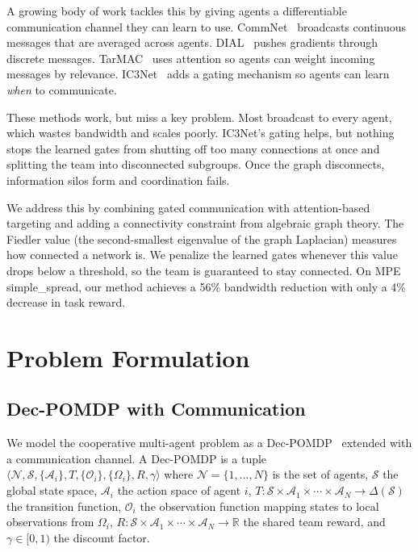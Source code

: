 \documentclass[letterpaper, 10 pt, journal, twoside]{IEEEtran}
\begin{document}
A growing body of work tackles this by giving agents a differentiable communication channel they can learn to use. CommNet~\cite{Sukhbaatar2016} broadcasts continuous messages that are averaged across agents. DIAL~\cite{Foerster2016} pushes gradients through discrete messages. TarMAC~\cite{Das2019} uses attention so agents can weight incoming messages by relevance. IC3Net~\cite{Singh2019} adds a gating mechanism so agents can learn \emph{when} to communicate.

These methods work, but miss a key problem. Most broadcast to every agent, which wastes bandwidth and scales poorly. IC3Net's gating helps, but nothing stops the learned gates from shutting off too many connections at once and splitting the team into disconnected subgroups. Once the graph disconnects, information silos form and coordination fails.

We address this by combining gated communication with attention-based targeting and adding a connectivity constraint from algebraic graph theory. The Fiedler value (the second-smallest eigenvalue of the graph Laplacian) measures how connected a network is. We penalize the learned gates whenever this value drops below a threshold, so the team is guaranteed to stay connected. On MPE simple\_spread, our method achieves a 56\% bandwidth reduction with only a 4\% decrease in task reward.

\section{Problem Formulation}

\subsection{Dec-POMDP with Communication}

We model the cooperative multi-agent problem as a Dec-POMDP~\cite{Oliehoek2016} extended with a communication channel. A Dec-POMDP is a tuple $\langle \mathcal{N}, \mathcal{S}, \{\mathcal{A}_i\}, T, \{\mathcal{O}_i\}, \{\Omega_i\}, R, \gamma \rangle$ where $\mathcal{N} = \{1, \dots, N\}$ is the set of agents, $\mathcal{S}$ the global state space, $\mathcal{A}_i$ the action space of agent $i$, $T: \mathcal{S} \times \mathcal{A}_1 \times \cdots \times \mathcal{A}_N \rightarrow \Delta(\mathcal{S})$ the transition function, $\mathcal{O}_i$ the observation function mapping states to local observations from $\Omega_i$, $R: \mathcal{S} \times \mathcal{A}_1 \times \cdots \times \mathcal{A}_N \rightarrow \mathbb{R}$ the shared team reward, and $\gamma \in [0,1)$ the discount factor.
\end{document}
